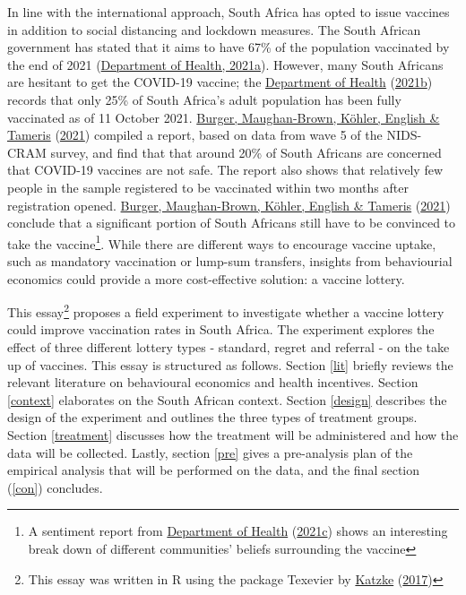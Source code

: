 \documentclass[11pt,preprint, authoryear]{elsarticle}
\numberwithin{equation}{section}
\numberwithin{figure}{section}
\numberwithin{table}{section}
\let\rmarkdownfootnote\footnote%
\def\footnote{\protect\rmarkdownfootnote}
\begin{document}
In line with the international approach, South Africa has opted to issue
vaccines in addition to social distancing and lockdown measures. The
South African government has stated that it aims to have 67\% of the
population vaccinated by the end of 2021
(\protect\hyperlink{ref-herd}{Department of Health, 2021a}). However,
many South Africans are hesitant to get the COVID-19 vaccine; the
\protect\hyperlink{ref-stat}{Department of Health}
(\protect\hyperlink{ref-stat}{2021b}) records that only 25\% of South
Africa's adult population has been fully vaccinated as of 11 October
2021. \protect\hyperlink{ref-cram}{Burger, Maughan-Brown, Köhler,
English \& Tameris} (\protect\hyperlink{ref-cram}{2021}) compiled a
report, based on data from wave 5 of the NIDS-CRAM survey, and find that
that around 20\% of South Africans are concerned that COVID-19 vaccines
are not safe. The report also shows that relatively few people in the
sample registered to be vaccinated within two months after registration
opened. \protect\hyperlink{ref-cram}{Burger, Maughan-Brown, Köhler,
English \& Tameris} (\protect\hyperlink{ref-cram}{2021}) conclude that a
significant portion of South Africans still have to be convinced to take
the vaccine\footnote{A sentiment report from
  \protect\hyperlink{ref-report}{Department of Health}
  (\protect\hyperlink{ref-report}{2021c}) shows an interesting break
  down of different communities' beliefs surrounding the vaccine}. While
there are different ways to encourage vaccine uptake, such as mandatory
vaccination or lump-sum transfers, insights from behaviourial economics
could provide a more cost-effective solution: a vaccine lottery.

This essay\footnote{This essay was written in R using the package
  Texevier by \protect\hyperlink{ref-Texevier}{Katzke}
  (\protect\hyperlink{ref-Texevier}{2017})} proposes a field experiment
to investigate whether a vaccine lottery could improve vaccination rates
in South Africa. The experiment explores the effect of three different
lottery types - standard, regret and referral - on the take up of
vaccines. This essay is structured as follows. Section \ref{lit} briefly
reviews the relevant literature on behavioural economics and health
incentives. Section \ref{context} elaborates on the South African
context. Section \ref{design} describes the design of the experiment and
outlines the three types of treatment groups. Section \ref{treatment}
discusses how the treatment will be administered and how the data will
be collected. Lastly, section \ref{pre} gives a pre-analysis plan of the
empirical analysis that will be performed on the data, and the final
section (\ref{con}) concludes.
\end{document}
